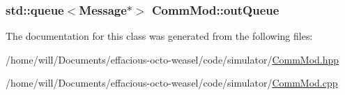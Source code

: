 \subsubsection[{\texorpdfstring{out\+Queue}{outQueue}}]{\setlength{\rightskip}{0pt plus 5cm}std\+::queue$<${\bf Message}$\ast$$>$ Comm\+Mod\+::out\+Queue\hspace{0.3cm}{\ttfamily [protected]}}\hypertarget{class_comm_mod_abbd4cbdbb8c4b8680a20aea400e2eabc}{}\label{class_comm_mod_abbd4cbdbb8c4b8680a20aea400e2eabc}


The documentation for this class was generated from the following files\+:\begin{DoxyCompactItemize}
\item 
/home/will/\+Documents/effacious-\/octo-\/weasel/code/simulator/\hyperlink{_comm_mod_8hpp}{Comm\+Mod.\+hpp}\item 
/home/will/\+Documents/effacious-\/octo-\/weasel/code/simulator/\hyperlink{_comm_mod_8cpp}{Comm\+Mod.\+cpp}\end{DoxyCompactItemize}
